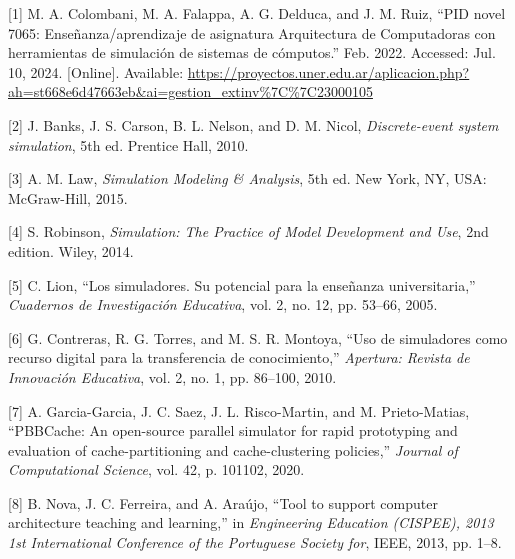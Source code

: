 \documentclass[12pt,oneside]{templates/unerthesis}
\newcommand{\CSLLeftMargin}[1]{#1} %
\newcommand{\CSLRightInline}[1]{#1} %
\newlength{\cslhangindent}
\newenvironment{CSLReferences}[2] %
 {\setlength{\parindent}{0pt}%
  \setlength{\leftskip}{#1 pt\relax}%
  \setlength{\parskip}{#2 pt\relax}%
  \everypar{\setlength{\hangindent}{\cslhangindent}}}
 {\par}
\begin{document}
\hypertarget{refs}{}
\begin{CSLReferences}{0}{0}
\leavevmode{}%
\CSLLeftMargin{{[}1{]} }%
\CSLRightInline{M. A. Colombani, M. A. Falappa, A. G. Delduca, and J. M. Ruiz, {``{PID} novel 7065: {Enseñanza}/aprendizaje de asignatura {Arquitectura} de {Computadoras} con herramientas de simulación de sistemas de cómputos.''} Feb. 2022. Accessed: Jul. 10, 2024. {[}Online{]}. Available: \url{https://proyectos.uner.edu.ar/aplicacion.php?ah=st668e6d47663eb&ai=gestion_extinv\%7C\%7C23000105}}

\leavevmode{}%
\CSLLeftMargin{{[}2{]} }%
\CSLRightInline{J. Banks, J. S. Carson, B. L. Nelson, and D. M. Nicol, \emph{Discrete-event system simulation}, 5th ed. Prentice Hall, 2010.}

\leavevmode{}%
\CSLLeftMargin{{[}3{]} }%
\CSLRightInline{A. M. Law, \emph{Simulation {Modeling} \& {Analysis}}, 5th ed. New York, NY, USA: McGraw-Hill, 2015.}

\leavevmode{}%
\CSLLeftMargin{{[}4{]} }%
\CSLRightInline{S. Robinson, \emph{Simulation: {The} {Practice} of {Model} {Development} and {Use}}, 2nd edition. Wiley, 2014.}

\leavevmode{}%
\CSLLeftMargin{{[}5{]} }%
\CSLRightInline{C. Lion, {``Los simuladores. {Su} potencial para la enseñanza universitaria,''} \emph{Cuadernos de Investigación Educativa}, vol. 2, no. 12, pp. 53--66, 2005.}

\leavevmode{}%
\CSLLeftMargin{{[}6{]} }%
\CSLRightInline{G. Contreras, R. G. Torres, and M. S. R. Montoya, {``Uso de simuladores como recurso digital para la transferencia de conocimiento,''} \emph{Apertura: Revista de Innovación Educativa}, vol. 2, no. 1, pp. 86--100, 2010.}

\leavevmode{}%
\CSLLeftMargin{{[}7{]} }%
\CSLRightInline{A. Garcia-Garcia, J. C. Saez, J. L. Risco-Martin, and M. Prieto-Matias, {``{PBBCache}: {An} open-source parallel simulator for rapid prototyping and evaluation of cache-partitioning and cache-clustering policies,''} \emph{Journal of Computational Science}, vol. 42, p. 101102, 2020.}

\leavevmode{}%
\CSLLeftMargin{{[}8{]} }%
\CSLRightInline{B. Nova, J. C. Ferreira, and A. Araújo, {``Tool to support computer architecture teaching and learning,''} in \emph{Engineering {Education} ({CISPEE}), 2013 1st {International} {Conference} of the {Portuguese} {Society} for}, IEEE, 2013, pp. 1--8.}


\end{CSLReferences}
\end{document}
